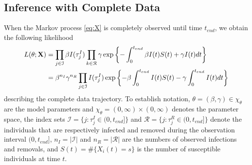\documentclass[11pt]{article}
\newcommand{\jx}[1]{{\color{blue}{ #1}}}
\newcommand{\ram}[1]{{\color{green}{ #1}}}
\begin{document}
	
	\subsection{Inference with Complete Data}
	\label{sec:icd}
	\jx{Need some citations here for form of conjugate/MLE forms, etc}
	
	When the Markov process \eqref{eq:X} is completely observed until time $t_{end}$, we obtain the following likelihood \cite{Streftaris.2002} 
	\begin{align}
		L(\theta; \mathbf{X})
		& = \prod_{j \in \mathcal{I}} \beta I(\tau^I_j) \prod_{k \in \mathcal{R}} \gamma \exp\left\lbrace - \int_{0}^{t_{end}}\beta I(t)S(t) + \gamma I(t) dt \right\rbrace  \nonumber \\
		\label{eq:cdl}
		& = \beta^{n_I} \gamma^{n_R}\prod_{j \in \mathcal{I}} I(\tau^I_j) \exp\left\lbrace - \beta \int_{0}^{t_{end}} I(t)S(t) - \gamma \int_{0}^{t_{end}} I(t) dt \right\rbrace
	\end{align}
	describing the complete data trajectory.
	To establish notation,
	$\theta = (\beta, \gamma) \in \chi_{\theta}$ are the model parameters 
	and $\chi_{\theta} = (0, \infty) \times (0, \infty)$ denotes the parameter space, 
	the index sets $\mathcal{I} = \{j: \tau^I_j \in (0, t_{end}]\}$ and $\mathcal{R} = \{j: \tau^R_j \in (0, t_{end}]\}$ denote the individuals that are respectively infected and removed during the observation interval $(0, t_{end}]$,
	$n_I = |\mathcal{I}|$ and $n_R = |\mathcal{R}|$ are the numbers of observed infections and removals,
	and	$S(t) = \#\{X_i(t) = s\}$ is the number of susceptible individuals at time $t$.
	
\end{document}
